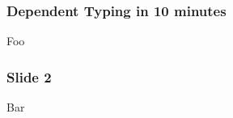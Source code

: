 \documentclass{beamer}
\begin{document}
\begin{frame}
  \frametitle{Dependent Typing in 10 minutes}
  Foo
\end{frame}
\begin{frame}
  \frametitle{Slide 2}
  Bar
\end{frame}
\end{document}
